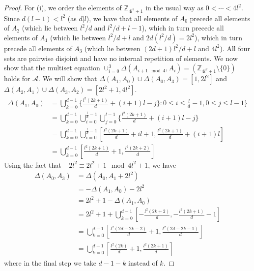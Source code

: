 \documentclass[10pt,a4paper]{amsart}
\begin{document}
\begin{proof}
For (i), we order the elements of $\mathbb{Z}_{4l^2+1}$ in the usual way as $0< \cdots <4l^2$.  Since $d(l-1)<l^2$ (as $d|l$), we have that all elements of $A_0$ precede all elements of $A_2$ (which lie between $l^2/d$ and $l^2/d+l-1$), which in turn precede all elements of $A_1$ (which lie between $l^2/d+l$ and $2d(l^2/d)=2l^2$), which in turn precede all elements of $A_3$ (which lie between $(2d+1)l^2/d+l$ and $4l^2$).  All four sets are pairwise disjoint and have no internal repetition of elements.
We now show that the multiset equation $\cup_{i=0}^{3} \Delta(A_{i+1 \mod 4}, A_i)= (\mathbb{Z}_{4l^2+1} \setminus \{0\})$ holds for $\mathcal{A}$.  We will show that $\Delta(A_1,A_0) \cup \Delta(A_0,A_3)=[1,2l^2]$ and $\Delta(A_2,A_1) \cup \Delta(A_3,A_2)=[2l^2+1,4l^2]$.
\begin{align*}
\Delta(A_1,A_0) &= \bigcup_{k=0}^{d-1}\{\frac{l^2(2k+1)}{d}+(i+1)l-j\}: 0 \leq i \leq \frac{l}{d}-1, 0 \leq j \leq l-1 \}\\
&=\bigcup_{k=0}^{d-1}\bigcup_{i=0}^{\frac{l}{d}-1}\bigcup_{j=0}^{l-1}\{\frac{l^2(2k+1)}{d}+(i+1)l -j \}\\
&=\bigcup_{k=0}^{d-1}\bigcup_{i=0}^{\frac{l}{d}-1}[\frac{l^2(2k+1)}{d}+il+1, \frac{l^2(2k+1)}{d}+(i+1)l ]\\
&=\bigcup_{k=0}^{d-1} [\frac{l^2(2k+1)}{d}+1, \frac{l^2(2k+2)}{d}]
\end{align*}
Using the fact that $-2l^2 \equiv 2l^2+1 \mod 4l^2+1$, we have
\begin{align*}
\Delta(A_0,A_3) &=\Delta(A_0,A_1+2l^2)\\
&=-\Delta(A_1,A_0)-2l^2\\
&= 2l^2+1 - \Delta(A_1,A_0)\\
&= 2l^2+1 + \bigcup_{k=0}^{d-1} [-\frac{l^2(2k+2)}{d},-\frac{l^2(2k+1)}{d}-1]\\
&=\bigcup_{k=0}^{d-1} [\frac{l^2(2d-2k-2)}{d}+1, \frac{l^2(2d-2k-1)}{d}]\\
&=\bigcup_{k=0}^{d-1} [\frac{l^2(2k)}{d}+1, \frac{l^2(2k+1)}{d}]
\end{align*}
where in the final step we take $d-1-k$ instead of $k$.


\end{proof}
\end{document}
